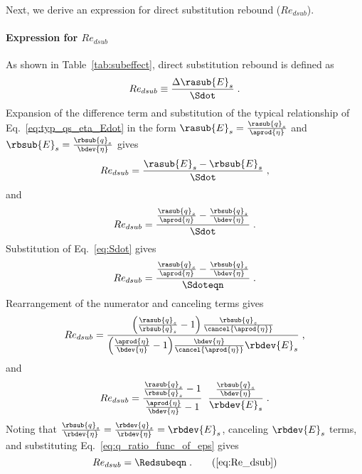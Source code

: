 Next, we derive an expression for direct substitution rebound ($Re_{dsub}$).


\paragraph{Expression for $Re_{dsub}$} 
\label{sec:Re_dsub}

As shown in Table~\ref{tab:subeffect}, direct substitution rebound is defined as 
%
\begin{equation} \label{eq:Re_dsub_def}
  Re_{dsub} \equiv \frac{\Delta \rasub{E}_s}{\Sdot} \; .
\end{equation}
%
Expansion of the difference term and 
substitution of the typical relationship of Eq.~\ref{eq:typ_qs_eta_Edot} in the form 
$\rasub{E}_s = \frac{\rasub{q}_s}{\aprod{\eta}}$ 
and 
$\rbsub{E}_s = \frac{\rbsub{q}_s}{\bdev{\eta}}$ 
gives
%
\begin{equation}
   Re_{dsub} = \frac{\rasub{E}_s - \rbsub{E}_s}{\Sdot} \; ,
\end{equation}
%
and
%
\begin{equation}
     Re_{dsub} = \frac{\frac{\rasub{q}_s}{\aprod{\eta}} - \frac{\rbsub{q}_s}{\bdev{\eta}}}{\Sdot} \; .
\end{equation}
%
Substitution of Eq.~\ref{eq:Sdot} gives
%
\begin{equation}
  Re_{dsub} = \frac{\frac{\rasub{q}_s}{\aprod{\eta}} - \frac{\rbsub{q}_s}{\bdev{\eta}}}
              {\Sdoteqn} \; .
\end{equation}
%
Rearrangement of the numerator and canceling terms gives
%
\begin{equation}
  Re_{dsub} = \frac{\left( \frac{\rasub{q}_s}{\rbsub{q}_s} - 1 \right) \frac{\rbsub{q}_s}{\cancel{\aprod{\eta}}} }
              {\left( \frac{\aprod{\eta}}{\bdev{\eta}} - 1 \right)\!\frac{\bdev{\eta}}{\cancel{\aprod{\eta}}} \rbdev{E}_s} \; ,
\end{equation}
%
and
%
\begin{equation}
    Re_{dsub} = \frac{\frac{\rasub{q}_s}{\rbsub{q}_s} - 1}{\frac{\aprod{\eta}}{\bdev{\eta}} - 1} \; \; 
                \frac{\frac{\rbsub{q}_s}{\bdev{\eta}}}{\rbdev{E}_s} \; .
\end{equation}
%
Noting that $\frac{\rbsub{q}_s}{\rbdev{\eta}} = \frac{\rbdev{q}_s}{\rbdev{\eta}} = \rbdev{E}_s$,
canceling $\rbdev{E}_s$ terms,
and substituting Eq.~\ref{eq:q_ratio_func_of_eps} gives
%
\begin{equation}
  Re_{dsub} = \Redsubeqn \; . \tag{\ref{eq:Re_dsub}}
\end{equation}

